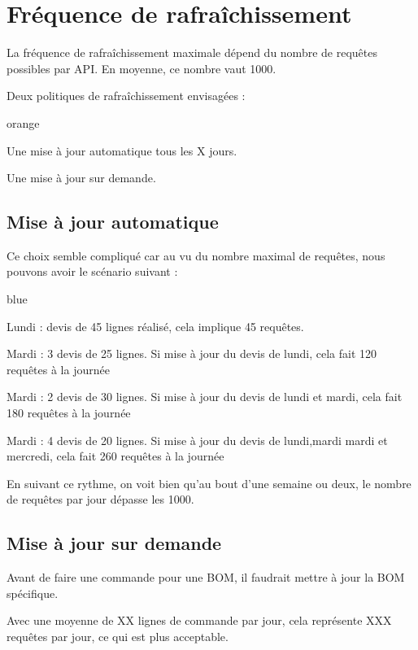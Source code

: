 {\section{Fréquence de rafraîchissement}

La fréquence de rafraîchissement maximale dépend du nombre de requêtes possibles par API. En moyenne, ce nombre vaut 1000.

Deux politiques de rafraîchissement envisagées : 

\begin{items}{orange}{\Triangle}
\item Une mise à jour automatique tous les X jours.
\item Une mise à jour sur demande.
\end{items}


\subsection{Mise à jour automatique}

Ce choix semble compliqué car au vu du nombre maximal de requêtes, nous pouvons avoir le scénario suivant : 


\begin{items}{blue}{\Triangle}
\item Lundi : devis de 45 lignes réalisé, cela implique 45 requêtes.
\item Mardi : 3 devis de 25 lignes. Si mise à jour du devis de lundi, cela fait 120 requêtes à la journée
\item Mardi : 2 devis de 30 lignes. Si mise à jour du devis de lundi et mardi, cela fait 180 requêtes à la journée
\item Mardi : 4 devis de 20 lignes. Si mise à jour du devis de lundi,mardi mardi et mercredi, cela fait 260 requêtes à la journée
\end{items}
En suivant ce rythme, on voit bien qu'au bout d'une semaine ou deux, le nombre de requêtes par jour dépasse les 1000.

\subsection{Mise à jour sur demande}

Avant de faire une commande pour une BOM, il faudrait mettre à jour la BOM spécifique.

Avec une moyenne de XX lignes de commande par jour, cela représente XXX requêtes par jour, ce qui est plus acceptable.%

}
